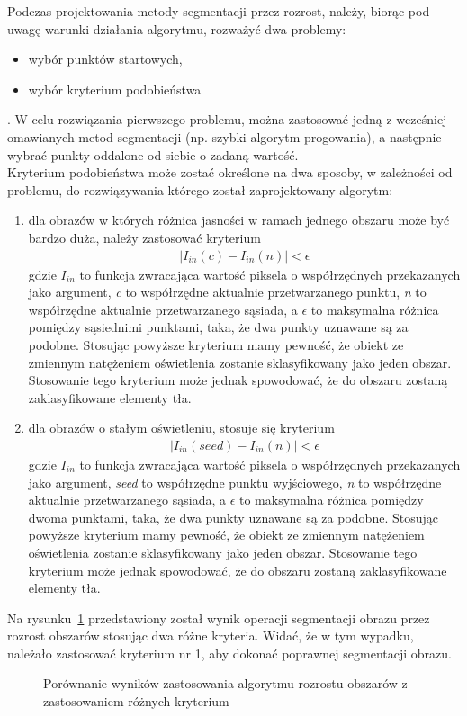 Podczas projektowania metody segmentacji przez rozrost, należy, biorąc pod uwagę warunki działania algorytmu, rozważyć dwa problemy:
\begin{itemize}
  \item wybór punktów startowych,
  \item wybór kryterium podobieństwa
\end{itemize}.
W celu rozwiązania pierwszego problemu, można zastosować jedną z wcześniej omawianych metod segmentacji (np. szybki algorytm progowania), a następnie wybrać punkty oddalone od siebie o zadaną wartość. \\
Kryterium podobieństwa może zostać określone na dwa sposoby, w zależności od problemu, do rozwiązywania którego został zaprojektowany algorytm:
\begin{enumerate}
  \item dla obrazów w których różnica jasności w ramach jednego obszaru może być bardzo duża, należy zastosować kryterium 
    \begin{gather*}
      |I_{in}(c) - I_{in}(n)| < \epsilon
    \end{gather*}
    gdzie $I_{in}$ to funkcja zwracająca wartość piksela o współrzędnych przekazanych jako argument, \textit{c} to współrzędne aktualnie przetwarzanego punktu, \textit{n} to współrzędne aktualnie przetwarzanego sąsiada, a $\epsilon$ to maksymalna różnica pomiędzy sąsiednimi punktami, taka, że dwa punkty uznawane są za podobne. Stosując powyższe kryterium mamy pewność, że obiekt ze zmiennym natężeniem oświetlenia zostanie sklasyfikowany jako jeden obszar. Stosowanie tego kryterium może jednak spowodować, że do obszaru zostaną zaklasyfikowane elementy tła.
    \item dla obrazów o stałym oświetleniu, stosuje się kryterium
      \begin{gather*}
        |I_{in}(seed) - I_{in}(n)| < \epsilon
      \end{gather*}
      gdzie $I_{in}$ to funkcja zwracająca wartość piksela o współrzędnych przekazanych jako argument, \textit{seed} to współrzędne punktu wyjściowego, \textit{n} to współrzędne aktualnie przetwarzanego sąsiada, a $\epsilon$ to maksymalna różnica pomiędzy dwoma punktami, taka, że dwa punkty uznawane są za podobne. Stosując powyższe kryterium mamy pewność, że obiekt ze zmiennym natężeniem oświetlenia zostanie sklasyfikowany jako jeden obszar. Stosowanie tego kryterium może jednak spowodować, że do obszaru zostaną zaklasyfikowane elementy tła.
\end{enumerate}
Na rysunku~\ref{fig:region_growing} przedstawiony został wynik operacji segmentacji obrazu przez rozrost obszarów stosując dwa różne kryteria. Widać, że w tym wypadku, należało zastosować kryterium nr 1, aby dokonać poprawnej segmentacji obrazu.
\begin{figure}
  \centering
  \caption{Porównanie wyników zastosowania algorytmu rozrostu obszarów z zastosowaniem różnych kryterium}
  \label{fig:region_growing}
\end{figure}

